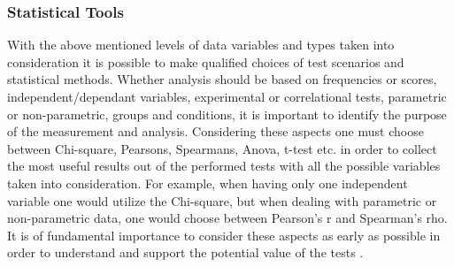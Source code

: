 \subsubsection{Statistical Tools}
With the above mentioned levels of data variables and types taken into consideration it is possible to make qualified choices of test scenarios and statistical methods. Whether analysis should be based on frequencies or scores, independent/dependant variables, experimental or correlational tests, parametric or non-parametric, groups and conditions, it is important to identify the purpose of the measurement and analysis. Considering these aspects one must choose between Chi-square, Pearsons, Spearmans, Anova, t-test etc. in order to collect the most useful results out of the performed tests with all the possible variables taken into consideration. For example, when having only one independent variable one would utilize the Chi-square, but when dealing with parametric or non-parametric data, one would choose between Pearson’s r and Spearman’s rho. It is of fundamental importance to consider these aspects as early as possible in order to understand and support the potential value of the tests \citep[page 274]{Design}.
